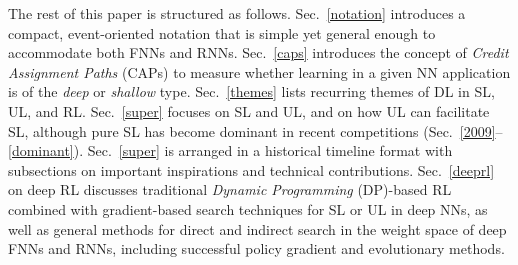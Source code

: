 \documentclass[letterpaper]{article}
\begin{document}
\begin{CJK*}{UTF8}{gbsn}
The rest of this paper is
structured as follows.
Sec.~\ref{notation} introduces
a compact, event-oriented notation that is simple yet general enough to accommodate both
FNNs and RNNs. 
Sec.~\ref{caps} introduces the concept of {\em Credit Assignment Paths} (CAPs) to measure whether learning in a given  NN application is of the {\em deep} or {\em shallow} type.
Sec.~\ref{themes} lists recurring themes of DL in SL, UL, and RL. 
Sec.~\ref{super}  focuses on SL and UL, 
and on how UL can facilitate SL, although pure SL
has become dominant in recent competitions  
(Sec.~\ref{2009}--\ref{dominant}).
Sec.~\ref{super} is arranged in a
historical timeline format with 
subsections on
important inspirations and technical contributions.
Sec.~\ref{deeprl} on deep RL discusses traditional
{\em Dynamic Programming} (DP)-based RL 
combined with gradient-based search techniques for SL or UL in deep NNs, 
as well as general methods for direct and indirect search in the weight space of deep 
FNNs and RNNs, 
including successful policy gradient and evolutionary methods.

 






%
%
%
%
%
\end{CJK*}
\end{document}
